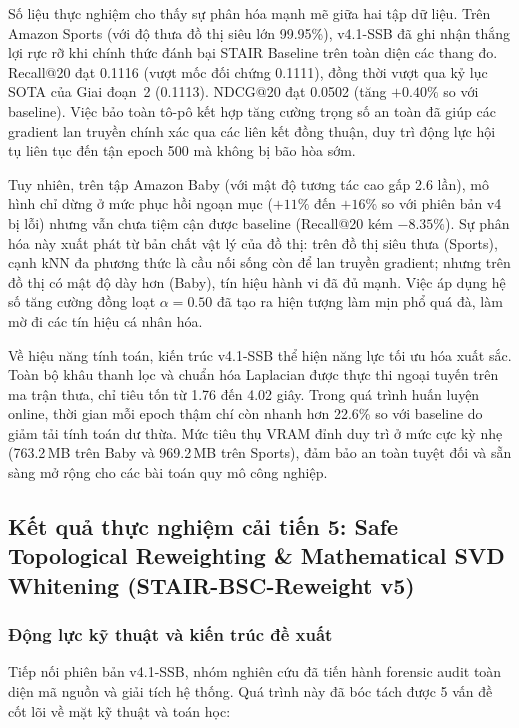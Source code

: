 Số liệu thực nghiệm cho thấy sự phân hóa mạnh mẽ giữa hai tập dữ liệu. Trên Amazon Sports (với độ thưa đồ thị siêu lớn 99.95\%), v4.1-SSB đã ghi nhận thắng lợi rực rỡ khi chính thức đánh bại STAIR Baseline trên toàn diện các thang đo. Recall@20 đạt 0.1116 (vượt mốc đối chứng 0.1111), đồng thời vượt qua kỷ lục SOTA của Giai đoạn~2 (0.1113). NDCG@20 đạt 0.0502 (tăng $+0.40\%$ so với baseline). Việc bảo toàn tô-pô kết hợp tăng cường trọng số an toàn đã giúp các gradient lan truyền chính xác qua các liên kết đồng thuận, duy trì động lực hội tụ liên tục đến tận epoch 500 mà không bị bão hòa sớm.

Tuy nhiên, trên tập Amazon Baby (với mật độ tương tác cao gấp 2.6 lần), mô hình chỉ dừng ở mức phục hồi ngoạn mục ($+11\%$ đến $+16\%$ so với phiên bản v4 bị lỗi) nhưng vẫn chưa tiệm cận được baseline (Recall@20 kém $-8.35\%$). Sự phân hóa này xuất phát từ bản chất vật lý của đồ thị: trên đồ thị siêu thưa (Sports), cạnh kNN đa phương thức là cầu nối sống còn để lan truyền gradient; nhưng trên đồ thị có mật độ dày hơn (Baby), tín hiệu hành vi đã đủ mạnh. Việc áp dụng hệ số tăng cường đồng loạt $\alpha = 0.50$ đã tạo ra hiện tượng làm mịn phổ quá đà, làm mờ đi các tín hiệu cá nhân hóa.

Về hiệu năng tính toán, kiến trúc v4.1-SSB thể hiện năng lực tối ưu hóa xuất sắc. Toàn bộ khâu thanh lọc và chuẩn hóa Laplacian được thực thi ngoại tuyến trên ma trận thưa, chỉ tiêu tốn từ 1.76 đến 4.02 giây. Trong quá trình huấn luyện online, thời gian mỗi epoch thậm chí còn nhanh hơn 22.6\% so với baseline do giảm tải tính toán dư thừa. Mức tiêu thụ VRAM đỉnh duy trì ở mức cực kỳ nhẹ (763.2\,MB trên Baby và 969.2\,MB trên Sports), đảm bảo an toàn tuyệt đối và sẵn sàng mở rộng cho các bài toán quy mô công nghiệp.

\subsection{Kết quả thực nghiệm cải tiến 5: Safe Topological Reweighting \& Mathematical SVD Whitening (STAIR-BSC-Reweight v5)}

\subsubsection{Động lực kỹ thuật và kiến trúc đề xuất}

Tiếp nối phiên bản v4.1-SSB, nhóm nghiên cứu đã tiến hành forensic audit toàn diện mã nguồn và giải tích hệ thống. Quá trình này đã bóc tách được 5 vấn đề cốt lõi về mặt kỹ thuật và toán học:

